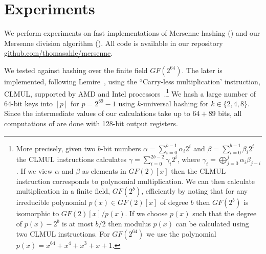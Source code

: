 \section{Experiments}\label{sec:experiments}
We perform experiments on fast implementations of Mersenne hashing () and our Mersenne division algorithm ().
All code is available in our repository\\\href{https://github.com/thomasahle/mersenne/}{github.com/thomasahle/mersenne}.

We tested  against hashing over the finite field $GF(2^{64})$.
The later is implemented, following Lemire~\cite{lemire2014strongly}, using the ``Carry-less multiplication' instruction, CLMUL, supported by AMD and Intel processors~\cite{GUERON2010549}.\footnote{
More precisely, given two $b$-bit numbers $\alpha = \sum_{i = 0}^{b - 1} \alpha_i 2^i$ and $\beta = \sum_{i = 0}^{b - 1} \beta_i 2^i$
the CLMUL instructions calculates $\gamma = \sum_{i = 0}^{2b - 2} \gamma_i 2^i$, where $\gamma_i = \bigoplus_{j = 0}^{j} \alpha_i \beta_{j - i}$.
If we view $\alpha$ and $\beta$ as elements in $GF(2)[x]$ then the CLMUL instruction corresponds to polynomial multiplication.
We can then calculate multiplication in a finite field, $GF(2^b)$, efficiently by noting that for any irreducible polynomial $p(x) \in GF(2)[x]$
of degree $b$ then $GF(2^b)$ is isomorphic to $GF(2)[x] / p(x)$. If we choose $p(x)$ such that the degree of $p(x) - 2^{b}$ is at
most $b/2$ then modulus $p(x)$ can be calculated using two CLMUL instructions.
For $GF(2^{64})$ we use the polynomial $p(x) = x^{64} + x^4 + x^3 + x + 1$.
}
%
We hash a large number of $64$-bit keys into $[p]$ for $p=2^{89}-1$ using $k$-universal hashing for $k \in \{2, 4, 8\}$.
Since the intermediate values of our calculations take up to $64 + 89$ bits, all computations of  are done with 128-bit output registers.

